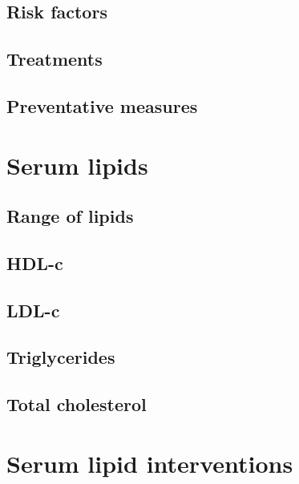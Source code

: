 \documentclass[a4paper, twoside]{templates/ociamthesis}
\begin{document}
\hypertarget{risk-factors}{%
\subsection{Risk factors}\label{risk-factors}}

\hypertarget{treatments}{%
\subsection{Treatments}\label{treatments}}

\hypertarget{preventative-measures}{%
\subsection{Preventative measures}\label{preventative-measures}}

\hypertarget{serum-lipids}{%
\section{Serum lipids}\label{serum-lipids}}

\hypertarget{range-of-lipids}{%
\subsection{Range of lipids}\label{range-of-lipids}}

\hypertarget{hdl-c}{%
\subsection{HDL-c}\label{hdl-c}}

\hypertarget{ldl-c}{%
\subsection{LDL-c}\label{ldl-c}}

\hypertarget{triglycerides}{%
\subsection{Triglycerides}\label{triglycerides}}

\hypertarget{total-cholesterol}{%
\subsection{Total cholesterol}\label{total-cholesterol}}

\hypertarget{serum-lipid-interventions}{%
\section{Serum lipid interventions}\label{serum-lipid-interventions}}
\end{document}
